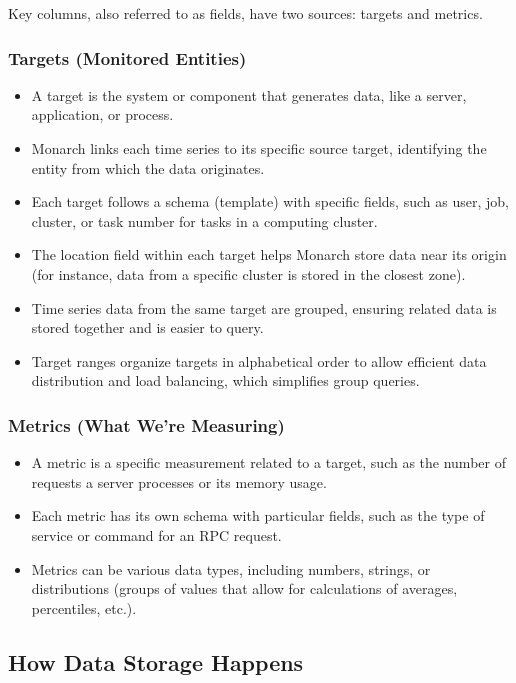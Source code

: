 Key columns, also referred to as fields, have two sources: targets and metrics.

\subsubsection*{Targets (Monitored Entities)}
\begin{itemize}
    \item A target is the system or component that generates data, like a server, application, or process.
    \item Monarch links each time series to its specific source target, identifying the entity from which the data originates.
    \item Each target follows a schema (template) with specific fields, such as user, job, cluster, or task number for tasks in a computing cluster.
    \item The location field within each target helps Monarch store data near its origin (for instance, data from a specific cluster is stored in the closest zone).
    \item Time series data from the same target are grouped, ensuring related data is stored together and is easier to query.
    \item Target ranges organize targets in alphabetical order to allow efficient data distribution and load balancing, which simplifies group queries.
\end{itemize}

\subsubsection*{Metrics (What We’re Measuring)}
\begin{itemize}
    \item A metric is a specific measurement related to a target, such as the number of requests a server processes or its memory usage.
    \item Each metric has its own schema with particular fields, such as the type of service or command for an RPC request.
    \item Metrics can be various data types, including numbers, strings, or distributions (groups of values that allow for calculations of averages, percentiles, etc.).
\end{itemize}

\subsection{How Data Storage Happens}


